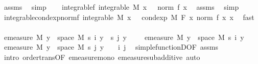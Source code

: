 \begin{isabellebody}
\ assms{\isacharparenleft}{\kern0pt}{}{\isacharparenright}{\kern0pt}\ \isamarkupfalse%
\ simp\isanewline
\ \ \isamarkupfalse%
\ integrable{\isacharunderscore}{\kern0pt}{}f{\isacharcolon}{\kern0pt}\ {\isachardoublequoteopen}integrable\ M\ {\isacharparenleft}{\kern0pt}{\isasymlambda}x{\isachardot}{\kern0pt}\ {}\ {\isacharasterisk}{\kern0pt}\ norm\ {\isacharparenleft}{\kern0pt}f\ x{\isacharparenright}{\kern0pt}{\isacharparenright}{\kern0pt}{\isachardoublequoteclose}\ \isamarkupfalse%
\ assms{\isacharparenleft}{\kern0pt}{}{\isacharparenright}{\kern0pt}\ \isamarkupfalse%
\ simp\isanewline
\ \ \isamarkupfalse%
\ integrable{\isacharunderscore}{\kern0pt}{}{\isacharunderscore}{\kern0pt}cond{\isacharunderscore}{\kern0pt}exp{\isacharunderscore}{\kern0pt}norm{\isacharunderscore}{\kern0pt}f{\isacharcolon}{\kern0pt}\ {\isachardoublequoteopen}integrable\ M\ {\isacharparenleft}{\kern0pt}{\isasymlambda}x{\isachardot}{\kern0pt}\ {}\ {\isacharasterisk}{\kern0pt}\ cond{\isacharunderscore}{\kern0pt}exp\ M\ F\ {\isacharparenleft}{\kern0pt}{\isasymlambda}x{\isachardot}{\kern0pt}\ norm\ {\isacharparenleft}{\kern0pt}f\ x{\isacharparenright}{\kern0pt}{\isacharparenright}{\kern0pt}\ x{\isacharparenright}{\kern0pt}{\isachardoublequoteclose}\ \isamarkupfalse%
\ fast\isanewline
\isanewline
\ \ \isamarkupfalse%
\ {\isachardoublequoteopen}emeasure\ M\ {\isacharbraceleft}{\kern0pt}y\ {\isasymin}\ space\ M{\isachardot}{\kern0pt}\ s\ i\ y\ {\isacharminus}{\kern0pt}\ s\ j\ y\ {\isasymnoteq}\ {}{\isacharbraceright}{\kern0pt}\ {\isasymle}\ \ emeasure\ M\ {\isacharbraceleft}{\kern0pt}y\ {\isasymin}\ space\ M{\isachardot}{\kern0pt}\ s\ i\ y\ {\isasymnoteq}\ {}{\isacharbraceright}{\kern0pt}\ {\isacharplus}{\kern0pt}\ emeasure\ M\ {\isacharbraceleft}{\kern0pt}y\ {\isasymin}\ space\ M{\isachardot}{\kern0pt}\ s\ j\ y\ {\isasymnoteq}\ {}{\isacharbraceright}{\kern0pt}{\isachardoublequoteclose}\ \ i\ j\ \isamarkupfalse%
\ simple{\isacharunderscore}{\kern0pt}functionD{\isacharparenleft}{\kern0pt}{}{\isacharparenright}{\kern0pt}{\isacharbrackleft}{\kern0pt}OF\ assms{\isacharparenleft}{\kern0pt}{}{\isacharparenright}{\kern0pt}{\isacharbrackright}{\kern0pt}\ \isamarkupfalse%
\ {\isacharparenleft}{\kern0pt}intro\ order{\isacharunderscore}{\kern0pt}trans{\isacharbrackleft}{\kern0pt}OF\ emeasure{\isacharunderscore}{\kern0pt}mono\ emeasure{\isacharunderscore}{\kern0pt}subadditive{\isacharbrackright}{\kern0pt}{\isacharcomma}{\kern0pt}\ auto{\isacharparenright}{\kern0pt}\isanewline

\end{isabellebody}
